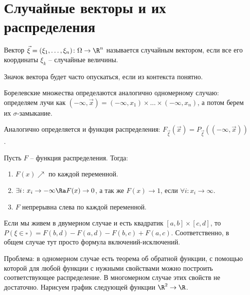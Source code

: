 \section{Случайные векторы и их распределения}

\begin{Def}
Вектор $\vec{\xi} = (\xi_1, \dots, \xi_n) \colon \Omega \to \R^n$ называется случайным вектором, если все его координаты $\xi_k$ -- случайные величины.
\end{Def}                                                                                                                                        
\begin{Rem}
Значок вектора будет часто опускаться, если из контекста понятно.
\end{Rem}

Борелевские множества определаются аналогично одномерному случаю: определяем лучи как $(-\infty, \vec{x}) = (-\infty, x_1) \times \dots \times (-\infty, x_n)$, а потом берем их $\sigma$-замыкание.

Аналогично определяется и функция распределения: $F_{\vec{\xi}}(\vec{x}) = P_{\vec{\xi}}((-\infty, \vec{x}))$.                                                                                                                                       

\begin{theorem}

Пусть $F$ -- функция распределения. Тогда:

\begin{enumerate}
\item $F(x) \nearrow$ по каждой переменной.

\item $\exists i\colon x_i \to -\infty \Ra F(x) \to 0$, а так же $F(x) \to 1$, если $\forall i\colon x_i \to \infty$.

\item $F$ непрерывна слева по каждой переменной.

\end{enumerate}
\end{theorem}

Если мы живем в двумерном случае и есть квадратик $[a, b] \times [c, d]$, то $P(\xi \in \square)= F(b, d) - F(a, d) - F(b, c) + F(a, c)$. 
Соответственно, в общем случае тут просто формула включений-исключений.

Проблема: в одномерном случае есть теорема об обратной функции, с помощью которой для любой функции с нужными свойствами можно построить соответствующее распределение.
В многомерном случае этих свойств не достаточно. Нарисуем график следующей функции $\R^2 \to \R$.

